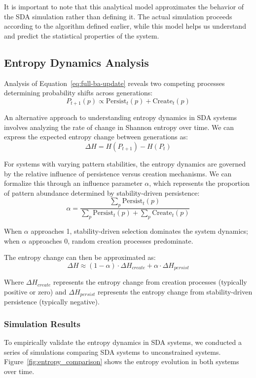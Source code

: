 \documentclass[preprint,12pt]{elsarticle}
\begin{document}
It is important to note that this analytical model approximates the behavior of the SDA simulation rather than defining it. The actual simulation proceeds according to the algorithm defined earlier, while this model helps us understand and predict the statistical properties of the system.

\subsection{Entropy Dynamics Analysis}
Analysis of Equation~\ref{eq:full-ba-update} reveals two competing processes determining probability shifts across generations:
\begin{equation}
P_{t+1}(p) \propto \mathrm{Persist}_t(p) + \mathrm{Create}_t(p)
\end{equation}

An alternative approach to understanding entropy dynamics in SDA systems involves analyzing the rate of change in Shannon entropy over time. We can express the expected entropy change between generations as:
\begin{equation}
\Delta H = H(P_{t+1}) - H(P_t)
\end{equation}

For systems with varying pattern stabilities, the entropy dynamics are governed by the relative influence of persistence versus creation mechanisms. We can formalize this through an influence parameter $\alpha$, which represents the proportion of pattern abundance determined by stability-driven persistence:
\begin{equation}
\alpha = \frac{\sum_p \mathrm{Persist}_t(p)}{\sum_p \mathrm{Persist}_t(p) + \sum_p \mathrm{Create}_t(p)}
\end{equation}

When $\alpha$ approaches 1, stability-driven selection dominates the system dynamics; when $\alpha$ approaches 0, random creation processes predominate.

The entropy change can then be approximated as:
\begin{equation}
\Delta H \approx (1 - \alpha) \cdot \Delta H_{create} + \alpha \cdot \Delta H_{persist}
\end{equation}

Where $\Delta H_{create}$ represents the entropy change from creation processes (typically positive or zero) and $\Delta H_{persist}$ represents the entropy change from stability-driven persistence (typically negative).

\subsubsection{Simulation Results}
To empirically validate the entropy dynamics in SDA systems, we conducted a series of simulations comparing SDA systems to unconstrained systems. Figure~\ref{fig:entropy_comparison} shows the entropy evolution in both systems over time.
\end{document}
